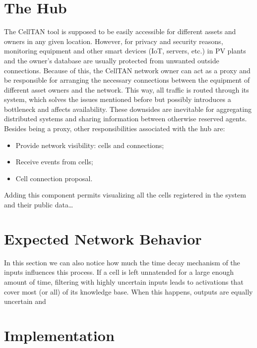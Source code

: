 
\section{The Hub}

The CellTAN tool is supposed to be easily accessible for different assets and owners in any given location. However, for privacy and security reasons, monitoring equipment and other smart devices (IoT, servers, etc.) in PV plants and the owner's database are usually protected from unwanted outside connections. Because of this, the CellTAN network owner can act as a proxy and be responsible for arranging the necessary connections between the equipment of different asset owners and the network. This way, all traffic is routed through its system, which solves the issues mentioned before but possibly introduces a bottleneck and affects availability. These downsides are inevitable for aggregating distributed systems and sharing information between otherwise reserved agents. Besides being a proxy, other responsibilities associated with the hub are:

\begin{itemize}
    \item Provide network visibility: cells and connections;
    \item Receive events from cells;
    \item Cell connection proposal.
\end{itemize}

Adding this component permits visualizing all the cells registered in the system and their public data\dots

\section{Expected Network Behavior}


In this section we can also notice how much the time decay mechanism of the inputs influences this process. If a cell is left unnatended for a large enough amount of time, filtering with highly uncertain inputs leads to activations that cover most (or all) of its knowledge base. When this happens, outputs are equally uncertain and 


\section{Implementation}

